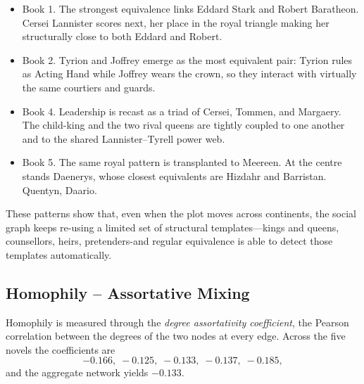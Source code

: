 \documentclass[12pt, a4paper]{article}
\begin{document}
 \begin{itemize}
     \item Book 1. The strongest equivalence links Eddard Stark and Robert Baratheon. Cersei Lannister scores next, her place in the royal triangle making her structurally close to both Eddard and Robert.
     \item Book 2. Tyrion and Joffrey emerge as the most equivalent pair: Tyrion rules as Acting Hand while Joffrey wears the crown, so they interact with virtually the same courtiers and guards.
     \item Book 4. Leadership is recast as a triad of Cersei, Tommen, and Margaery. The child-king and the two rival queens are tightly coupled to one another and to the shared Lannister–Tyrell power web.
     \item Book 5. The same royal pattern is transplanted to Meereen. At the centre stands Daenerys, whose closest equivalents are Hizdahr and Barristan. Quentyn, Daario.
 \end{itemize}

These patterns show that, even when the plot moves across continents, the social graph keeps re-using a limited set of structural templates—kings and queens, counsellors, heirs, pretenders-and regular equivalence is able to detect those templates automatically.

\subsection*{Homophily – Assortative Mixing}

Homophily is measured through the \emph{degree assortativity coefficient}, the Pearson correlation between the degrees of the two nodes at every edge.  
Across the five novels the coefficients are
\[
-0.166,\;-0.125,\;-0.133,\;-0.137,\;-0.185,
\]
and the aggregate network yields \(-0.133\).
\end{document}
